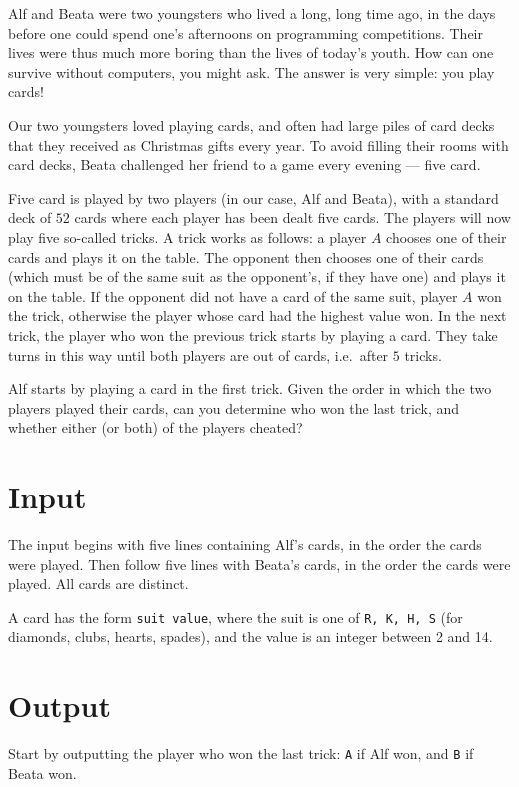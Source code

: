 Alf and Beata were two youngsters who lived a long, long time ago, in the days before one could spend one's afternoons on programming competitions.
Their lives were thus much more boring than the lives of today's youth.
How can one survive without computers, you might ask.
The answer is very simple: you play cards!

Our two youngsters loved playing cards, and often had large piles of card decks that they received as Christmas gifts every year.
To avoid filling their rooms with card decks, Beata challenged her friend to a game every evening --- five card.

Five card is played by two players (in our case, Alf and Beata), with a standard deck of $52$ cards where each player has been dealt five cards.
The players will now play five so-called tricks.
A trick works as follows: a player $A$ chooses one of their cards and plays it on the table.
The opponent then chooses one of their cards (which must be of the same suit as the opponent's, if they have one) and plays it on the table.
If the opponent did not have a card of the same suit, player $A$ won the trick, otherwise the player whose card had the highest value won.
In the next trick, the player who won the previous trick starts by playing a card.
They take turns in this way until both players are out of cards, i.e.\ after $5$ tricks.

Alf starts by playing a card in the first trick.
Given the order in which the two players played their cards, can you determine who won the last trick, and whether either (or both) of the players cheated?

\section*{Input}
The input begins with five lines containing Alf's cards, in the order the cards were played.
Then follow five lines with Beata's cards, in the order the cards were played. All cards are distinct.

A card has the form \texttt{suit value}, where the suit is one of \texttt{R, K, H, S} (for diamonds, clubs, hearts, spades), and the value is an integer between 2 and 14.

\section*{Output}
Start by outputting the player who won the last trick: \texttt{A} if Alf won, and \texttt{B} if Beata won.

